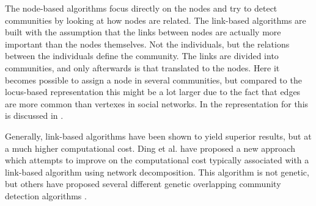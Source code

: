 The node-based algorithms focus directly on the nodes and try to detect communities by looking at how nodes are related. 
The link-based algorithms are built with the assumption that the links between nodes are actually more important than the nodes themselves. 
Not the individuals, but the relations between the individuals define the community. 
The links are divided into communities, and only afterwards is that translated to the nodes. 
Here it becomes possible to assign a node in several communities, but compared to the locus-based representation this might be a lot larger due to the fact that edges are more common than vertexes in social networks.
In the representation for this is discussed in \cite{Shi2013}.

Generally, link-based algorithms have been shown to yield superior results, but at a much higher computational cost. 
Ding et al. \cite{Ding2016} have proposed a new approach which attempts to improve on the computational cost typically associated with a link-based algorithm using network decomposition. 
This algorithm is not genetic,  but others have proposed several different genetic overlapping community detection algorithms \cite{Shi2013, Pizzuti2009, Dickinson2013}.\\
